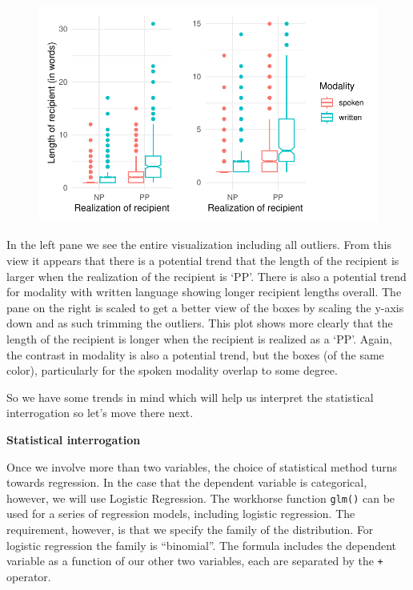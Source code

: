 \documentclass[
  letterpaper,
]{latex/krantz}
\begin{document}
\begin{figure}[h]

{\centering \includegraphics{inference_files/figure-pdf/i-multi-cat-visual-1.pdf}

}

\end{figure}

In the left pane we see the entire visualization including all outliers.
From this view it appears that there is a potential trend that the
length of the recipient is larger when the realization of the recipient
is `PP'. There is also a potential trend for modality with written
language showing longer recipient lengths overall. The pane on the right
is scaled to get a better view of the boxes by scaling the y-axis down
and as such trimming the outliers. This plot shows more clearly that the
length of the recipient is longer when the recipient is realized as a
`PP'. Again, the contrast in modality is also a potential trend, but the
boxes (of the same color), particularly for the spoken modality overlap
to some degree.

So we have some trends in mind which will help us interpret the
statistical interrogation so let's move there next.

\textbf{Statistical interrogation}

Once we involve more than two variables, the choice of statistical
method turns towards regression. In the case that the dependent variable
is categorical, however, we will use Logistic Regression. The workhorse
function \texttt{glm()} can be used for a series of regression models,
including logistic regression. The requirement, however, is that we
specify the family of the distribution. For logistic regression the
family is ``binomial''. The formula includes the dependent variable as a
function of our other two variables, each are separated by the
\texttt{+} operator.
\end{document}
